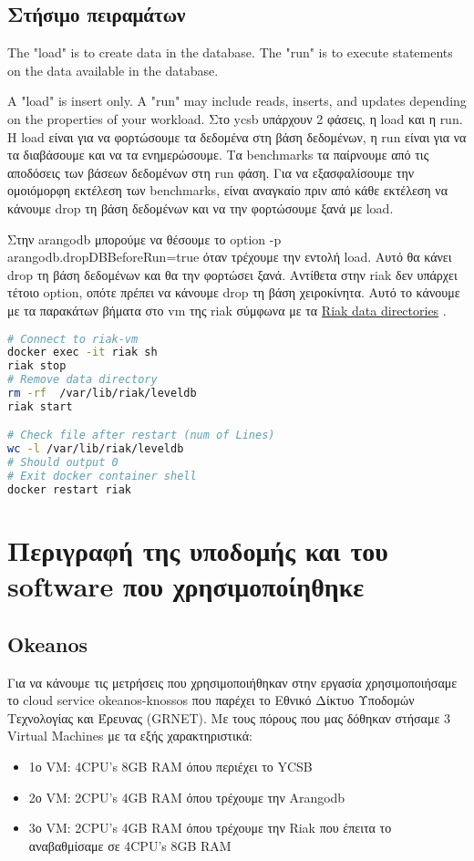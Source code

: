 \documentclass[conference]{IEEEtran}
\begin{document}
\subsection{Στήσιμο πειραμάτων}
The "load" is to create data in the database. The "run" is to execute statements on the data available in the database.

A "load" is insert only. A "run" may include reads, inserts, and updates depending on the properties of your workload.
Στο ycsb υπάρχουν 2 φάσεις, η load και η run. Η load είναι για να φορτώσουμε τα 
δεδομένα στη βάση δεδομένων, η run είναι για να τα διαβάσουμε και να τα 
ενημερώσουμε. Τα benchmarks τα παίρνουμε από τις αποδόσεις των βάσεων δεδομένων
στη run φάση.
Για να εξασφαλίσουμε την ομοιόμορφη εκτέλεση των benchmarks, είναι αναγκαίο πριν 
από κάθε εκτέλεση να κάνουμε drop τη βάση δεδομένων και να την φορτώσουμε ξανά με load.

Στην arangodb μπορούμε να θέσουμε το option -p arangodb.dropDBBeforeRun=true όταν τρέχουμε 
την εντολή load. Αυτό θα κάνει drop τη βάση δεδομένων και θα την φορτώσει ξανά.
Αντίθετα στην riak δεν υπάρχει τέτοιο option, οπότε πρέπει να κάνουμε drop τη βάση
χειροκίνητα. Αυτό το κάνουμε με τα παρακάτων βήματα στο vm της riak σύμφωνα με τα 
\href{https://docs.riak.com/riak/kv/2.1.4/using/cluster-operations/backing-up/#os-specific-directory-locations}{Riak data directories}
.
\begin{lstlisting}[language=bash
    ,    basicstyle=\small %or \tiny or \footnotesize etc.
]
# Connect to riak-vm
docker exec -it riak sh
riak stop
# Remove data directory
rm -rf 	/var/lib/riak/leveldb
riak start

# Check file after restart (num of Lines)
wc -l /var/lib/riak/leveldb
# Should output 0
# Exit docker container shell
docker restart riak
\end{lstlisting}


\section{Περιγραφή της υποδομής και του software που χρησιμοποίηθηκε}

\subsection{Okeanos}
Για να κάνουμε τις μετρήσεις που χρησιμοποιήθηκαν στην εργασία χρησιμοποιήσαμε το cloud service okeanos-knossos που παρέχει το Εθνικό Δίκτυο Υποδομών Τεχνολογίας και Έρευνας (GRNET). Mε τους πόρους που μας δόθηκαν στήσαμε 3 Virtual Machines με τα εξής χαρακτηριστικά:
\begin{itemize}

\item
1ο VM: 4CPU’s 8GB RAM όπου περιέχει το YCSB
\item
2ο VM: 2CPU’s 4GB RAM όπου τρέχουμε την Arangodb
\item
3ο VM: 2CPU’s 4GB RAM όπου τρέχουμε την Riak  που έπειτα το αναβαθμίσαμε σε 4CPU’s 8GB RAM

\end{itemize}
\end{document}
